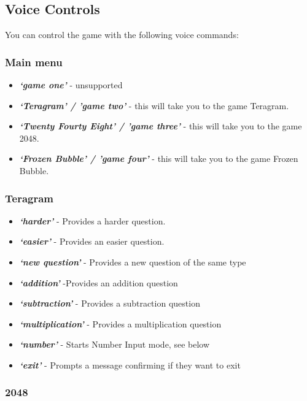 \documentclass[11pt, oneside]{article}
\begin{document}
\subsection{Voice Controls}

You can control the game with the following voice commands:

\subsubsection{Main menu}

\begin{itemize}
  \item {\em\bf`game one'} - unsupported
  \item {\em\bf`Teragram' / 'game two'}  - this will take you to the game Teragram.
  \item {\em\bf`Twenty Fourty Eight' / 'game three'} - this will take you to the game 2048.
  \item {\em\bf`Frozen Bubble' / 'game four'} - this will take you to the game Frozen Bubble.
\end{itemize}

\subsubsection{Teragram}

\begin{itemize}
  \item {\em\bf`harder'} - Provides a harder question. 
  \item {\em\bf`easier'} - Provides an easier question.
  \item {\em\bf`new question'} - Provides a new question of the same type
  \item {\em\bf`addition'} -Provides an addition question
  \item {\em\bf`subtraction'} - Provides a subtraction question
  \item {\em\bf`multiplication'} - Provides a multiplication question 
  \item {\em\bf`number'} - Starts Number Input mode, see below
  \item {\em\bf`exit'} - Prompts a message confirming if they want to exit
 
\end{itemize}

\subsubsection{2048}
\end{document}
